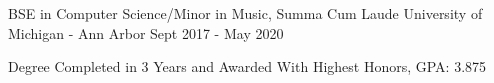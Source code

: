 \documentclass[]{awesome-cv}
\begin{document}



\vspace{-2mm}
\cventry
	{BSE in Computer Science/Minor in Music, Summa Cum Laude}
	{University of Michigan - Ann Arbor}
	{}
	{Sept 2017 - May 2020}
	{\begin{cvitems}
		\item{Degree Completed in 3 Years and Awarded With Highest Honors, GPA: 3.875}
		\end{cvitems}}
\end{document}
